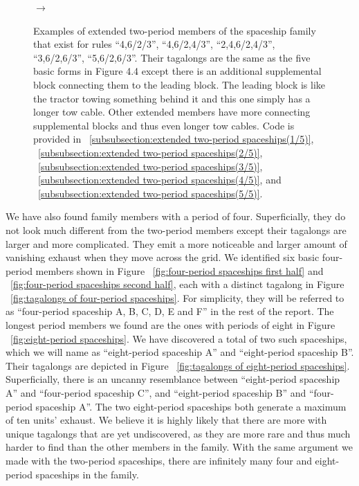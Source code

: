\documentclass[12pt]{article}
\numberwithin{figure}{section} %
\begin{document}
\begin{figure}[H]
\begin{subfigure}{0.3\textwidth}
     		\subcaption{}
   	\end{subfigure}
      	{\LARGE$\xrightarrow{}$}
   	\setcounter{subfigure}{0}
   	\caption[Extended two-period spaceships]{Examples of extended two-period members of the spaceship family that exist for rules “4,6/2/3”, “4,6/2,4/3”, “2,4,6/2,4/3”, “3,6/2,6/3”, “5,6/2,6/3”. Their tagalongs are the same as the five basic forms in Figure 4.4 except there is an additional supplemental block connecting them to the leading block. The leading block is like the tractor towing something behind it and this one simply has a longer tow cable. Other extended members have more connecting supplemental blocks and thus even longer tow cables. Code is provided in ~\ref{subsubsection:extended two-period spaceships(1/5)}, ~\ref{subsubsection:extended two-period spaceships(2/5)}, ~\ref{subsubsection:extended two-period spaceships(3/5)}, ~\ref{subsubsection:extended two-period spaceships(4/5)}, and ~\ref{subsubsection:extended two-period spaceships(5/5)}. }
   	\label{fig:extended two-period spaceships}
   	\vspace{-1.5em}
\end{figure}

We have also found family members with a period of four. Superficially, they do not look much different from the two-period members except their tagalongs are larger and more complicated. They emit a more noticeable and larger amount of vanishing exhaust when they move across the grid. We identified six basic four-period members shown in Figure ~\ref{fig:four-period spaceships first half} and ~\ref{fig:four-period spaceships second half}, each with a distinct tagalong in Figure ~\ref{fig:tagalongs of four-period spaceships}. For simplicity, they will be referred to as “four-period spaceship A, B, C, D, E and F” in the rest of the report. The longest period members we found are the ones with periods of eight in Figure ~\ref{fig:eight-period spaceships}. We have discovered a total of two such spaceships, which we will name as “eight-period spaceship A” and “eight-period spaceship B”. Their tagalongs are depicted in Figure ~\ref{fig:tagalongs of eight-period spaceships}. Superficially, there is an uncanny resemblance between “eight-period spaceship A” and “four-period spaceship C”, and “eight-period spaceship B” and “four-period spaceship A”. The two eight-period spaceships both generate a maximum of ten units’ exhaust. We believe it is highly likely that there are more with unique tagalongs that are yet undiscovered, as they are more rare and thus much harder to find than the other members in the family. With the same argument we made with the two-period spaceships, there are infinitely many four and eight-period spaceships in the family. 
\end{document}
